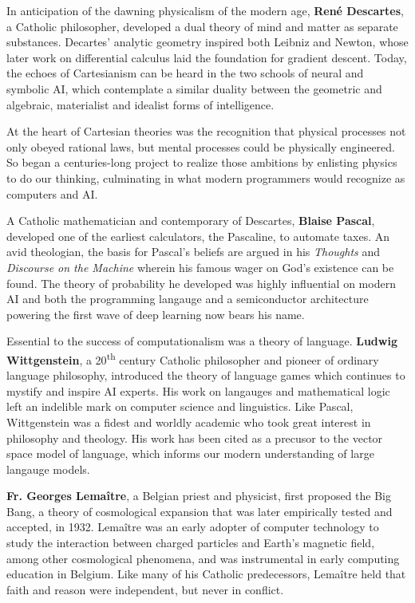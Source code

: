 \documentclass[sigplan,nonacm]{acmart}\settopmatter{printfolios=false,printccs=false,printacmref=false}
\begin{document}
  In anticipation of the dawning physicalism of the modern age, \textbf{Ren\'e Descartes}, a Catholic philosopher, developed a dual theory of mind and matter as separate substances. Decartes' analytic geometry inspired both Leibniz and Newton, whose later work on differential calculus laid the foundation for gradient descent. Today, the echoes of Cartesianism can be heard in the two schools of neural and symbolic AI, which contemplate a similar duality between the geometric and algebraic, materialist and idealist forms of intelligence.

  At the heart of Cartesian theories was the recognition that physical processes not only obeyed rational laws, but mental processes could be physically engineered. So began a centuries-long project to realize those ambitions by enlisting physics to do our thinking, culminating in what modern programmers would recognize as computers and AI.

  A Catholic mathematician and contemporary of Descartes, \textbf{Blaise Pascal}, developed one of the earliest calculators, the Pascaline, to automate taxes. An avid theologian, the basis for Pascal's beliefs are argued in his \textit{Thoughts} and \textit{Discourse on the Machine} wherein his famous wager on God's existence can be found. The theory of probability he developed was highly influential on modern AI and both the programming langauge and a semiconductor architecture powering the first wave of deep learning now bears his name.

  Essential to the success of computationalism was a theory of language. \textbf{Ludwig Wittgenstein}, a 20\textsuperscript{th} century Catholic philosopher and pioneer of ordinary language philosophy, introduced the theory of language games which continues to mystify and inspire AI experts. His work on langauges and mathematical logic left an indelible mark on computer science and linguistics. Like Pascal, Wittgenstein was a fidest and worldly academic who took great interest in philosophy and theology. His work has been cited as a precusor to the vector space model of language, which informs our modern understanding of large langauge models.

  \textbf{Fr. Georges Lema\^itre}, a Belgian priest and physicist, first proposed the Big Bang, a theory of cosmological expansion that was later empirically tested and accepted, in 1932. Lema\^itre was an early adopter of computer technology to study the interaction between charged particles and Earth's magnetic field, among other cosmological phenomena, and was instrumental in early computing education in Belgium. Like many of his Catholic predecessors, Lema\^itre held that faith and reason were independent, but never in conflict.
\end{document}
